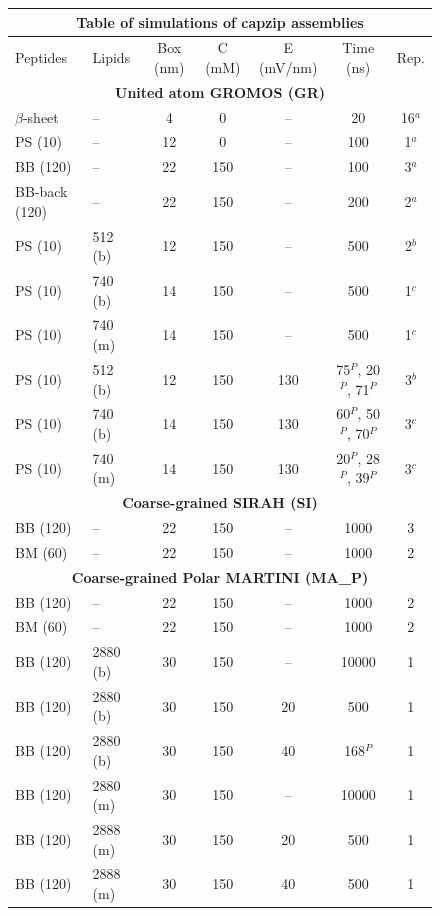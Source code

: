 \begin{figure}[p!]
\centering
\scriptsize
 \def\arraystretch{1.6}
\begin{tabular}{llccccc}
\multicolumn{7}{c}{\small\textbf{Table of simulations of capzip assemblies}} \\
 \hline
Peptides & Lipids & Box (nm) & C (mM) & E (mV/nm) & Time (ns) & Rep. \\
 \hline
\multicolumn{7}{c}{\textbf{United atom GROMOS (GR)}} \\
 $\beta$-sheet & -- & 4 & 0 & -- & 20 & 16$^a$ \\
 PS (10) & -- & 12 & 0 & -- & 100 & 1$^a$ \\
 BB (120) & -- & 22 & 150 & -- & 100 & 3$^a$ \\
 BB-back (120) & -- & 22 & 150 & -- & 200 & 2$^a$ \\
 PS (10) & 512 (b) & 12 & 150 & -- & 500 & 2$^b$ \\
 PS (10) & 740 (b) & 14 & 150 & -- & 500 & 1$^c$ \\
 PS (10) & 740 (m) & 14 & 150 & -- & 500 & 1$^c$ \\
 PS (10) & 512 (b) & 12 & 150 & 130 & 75$^P$, 20$^P$, 71$^P$ & 3$^b$ \\
 PS (10) & 740 (b) & 14 & 150 & 130 & 60$^P$, 50$^P$, 70$^P$ & 3$^c$ \\
 PS (10) & 740 (m) & 14 & 150 & 130 & 20$^P$, 28$^P$, 39$^P$ & 3$^c$ \\
 \hline
\multicolumn{7}{c}{\textbf{Coarse-grained SIRAH (SI)}} \\
 BB (120) & -- & 22 & 150 & -- & 1000 & 3 \\
 BM (60) & -- & 22 & 150 & -- & 1000 & 2 \\
 \hline
\multicolumn{7}{c}{\textbf{Coarse-grained Polar MARTINI (MA\_P)}} \\
 BB (120) & -- & 22 & 150 & -- & 1000 & 2 \\
 BM (60) & -- & 22 & 150 & -- & 1000 & 2 \\
 BB (120) & 2880 (b) & 30 & 150 & -- & 10000 & 1 \\
 BB (120) & 2880 (b) & 30 & 150 & 20 & 500 & 1 \\
 BB (120) & 2880 (b) & 30 & 150 & 40 & 168$^P$ & 1 \\
 BB (120) & 2880 (m) & 30 & 150 & -- & 10000 & 1 \\
 BB (120) & 2888 (m) & 30 & 150 & 20 & 500 & 1 \\
 BB (120) & 2888 (m) & 30 & 150 & 40 & 500 & 1 \\

\end{tabular}
\end{figure}

